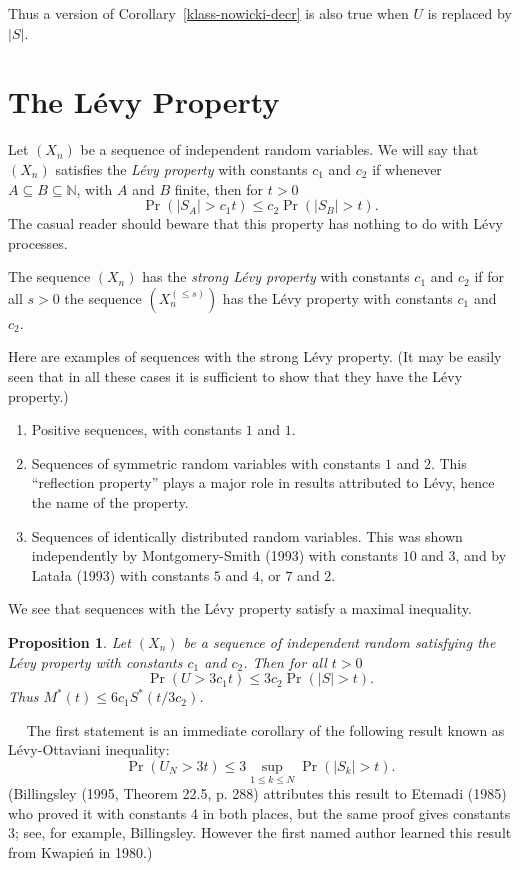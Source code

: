 \documentclass[12pt]{article}
\newtheorem{prop}[thm]{Proposition}
\newcommand{\N}{{\mathbb N}}
\newcommand{\modo}[1]{{\left|#1\right|}}
\newcommand{\smodo}[1]{{\mathopen|#1\mathclose|}}
\newcommand{\Proof}{\medskip\noindent{\bf Proof:}\ \ }
\begin{document}
Thus a version of 
Corollary~\ref{klass-nowicki-decr} is also true when $U$ is replaced
by $\modo S$.

\section{The L\'evy Property}
\label{Levy}

Let $(X_n)$ be a sequence of independent random variables. We will say 
that $(X_n)$ satisfies the {\em L\'evy property\/} with constants $c_1$ 
and $c_2$ if whenever $A
\subseteq B 
\subseteq \N$, with $A$ and $B$ finite, then for $t>0$
$$ \Pr(\smodo{S_A} > c_1 t)\le c_2 \Pr(\smodo{S_B} > t) .$$ 
The casual reader should beware that this property has nothing to do
with L\'evy processes.

The sequence $(X_n)$ has the {\em strong L\'evy property\/} with
constants 
$c_1$ and $c_2$ if for all $s>0$ the sequence $(X_n^{(\le s)})$ has
the L\'evy property with constants $c_1$ and $c_2$.

Here are examples of sequences with the strong L\'evy property. (It
may be easily seen that in all these cases it is sufficient to
show that 
they have the L\'evy property.) 
\begin{enumerate}
\item Positive sequences,
with constants $1$ and $1$. 
\item Sequences of symmetric random variables
with constants $1$ and
$2$. This ``reflection property'' plays a major role in results
attributed to L\'evy, hence the name of the property. 
\item Sequences of identically distributed random variables. This was shown 
independently by Montgomery-Smith (1993) with constants $10$ and $3$,
and by Lata{\l}a (1993) with constants $5$ and $4$, or $7$ and
$2$.
\end{enumerate}
We see that sequences with the L\'evy property
satisfy a maximal inequality.

\begin{prop}
\label{max}
Let
$(X_n)$ be a sequence of independent random satisfying the L\'evy
property with constants $c_1$ and $c_2$. Then for all $t>0$
$$ \Pr( U > 3 c_1 t) \le3 c_2 \Pr ( \smodo S > t ) .$$ 
Thus $M^*(t) \le 6 c_1
S^*(t/3c_2)$.
\end{prop}

\Proof
The first statement is an immediate corollary of the
following result known as L\'evy-Ottaviani
inequality: 
$$ \Pr(U_N > 3 t)\le3 \sup_{1 \le k \le N} \Pr( \smodo{S_k} > t ) .$$
(Billingsley (1995, Theorem 22.5, p. 288) attributes
this result to Etemadi (1985) who proved it with constants 4 in both
places, but the same proof gives constants 3; see, for example,
Billingsley.  
However the first named author learned this result from
Kwapie\'n in 1980.)
\end{document}
